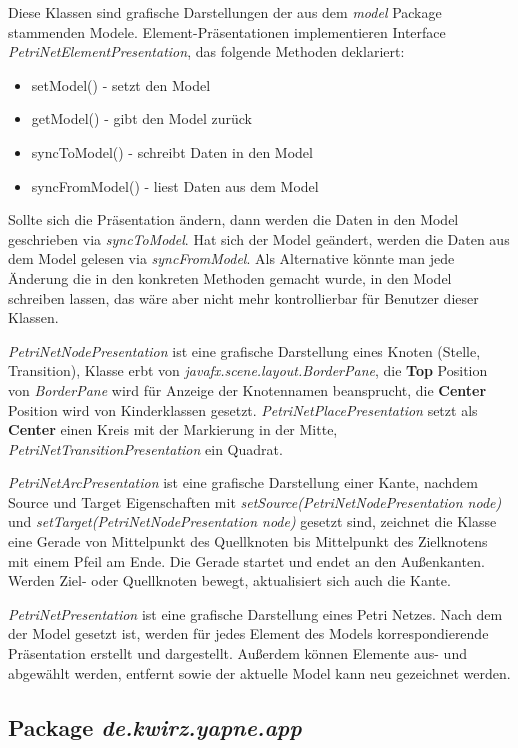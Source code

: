 \documentclass[12pt]{article}
\begin{document}
Diese Klassen sind grafische Darstellungen der aus dem \emph{model} Package stammenden Modele. Element-Präsentationen implementieren Interface
\emph{PetriNetElementPresentation}, das folgende Methoden deklariert:
\begin{itemize}
\item{setModel() - setzt den Model}
\item{getModel() - gibt den Model zurück}
\item{syncToModel() - schreibt Daten in den Model}
\item{syncFromModel() - liest Daten aus dem Model}
\end{itemize}
Sollte sich die Präsentation ändern, dann werden die Daten in den Model geschrieben via \emph{syncToModel}. Hat sich der Model geändert, werden die Daten aus dem Model gelesen via \emph{syncFromModel}. Als Alternative könnte man jede Änderung die in den konkreten Methoden gemacht wurde, in den Model schreiben lassen, das wäre aber nicht mehr kontrollierbar für Benutzer dieser Klassen.

\emph{PetriNetNodePresentation} ist eine grafische Darstellung eines Knoten (Stelle, Transition), Klasse erbt von \emph{javafx.scene.layout.BorderPane}, die \textbf{Top} Position von \emph{BorderPane} wird für Anzeige der Knotennamen beansprucht, die \textbf{Center} Position wird von Kinderklassen gesetzt. \emph{PetriNetPlacePresentation} setzt als \textbf{Center} einen Kreis mit der Markierung in der Mitte, \emph{PetriNetTransitionPresentation} ein Quadrat.

\emph{PetriNetArcPresentation} ist eine grafische Darstellung einer Kante, nachdem Source und Target Eigenschaften mit \emph{setSource(PetriNetNode\-Presentation node)} und \emph{setTarget(PetriNetNodePresentation node)} gesetzt sind, zeichnet die Klasse eine Gerade von Mittelpunkt des Quellknoten bis Mittelpunkt des Zielknotens mit einem Pfeil am Ende. Die Gerade startet und endet an den Außenkanten. Werden Ziel- oder Quellknoten bewegt, aktualisiert sich auch die Kante.

\emph{PetriNetPresentation} ist eine grafische Darstellung eines Petri Netzes. Nach dem der Model gesetzt ist, werden für jedes Element des Models korrespondierende Präsentation erstellt und dargestellt. Außerdem können Elemente aus- und abgewählt werden, entfernt sowie der aktuelle Model kann neu gezeichnet werden.

\subsection{Package \emph{de.kwirz.yapne.app}}
\end{document}
